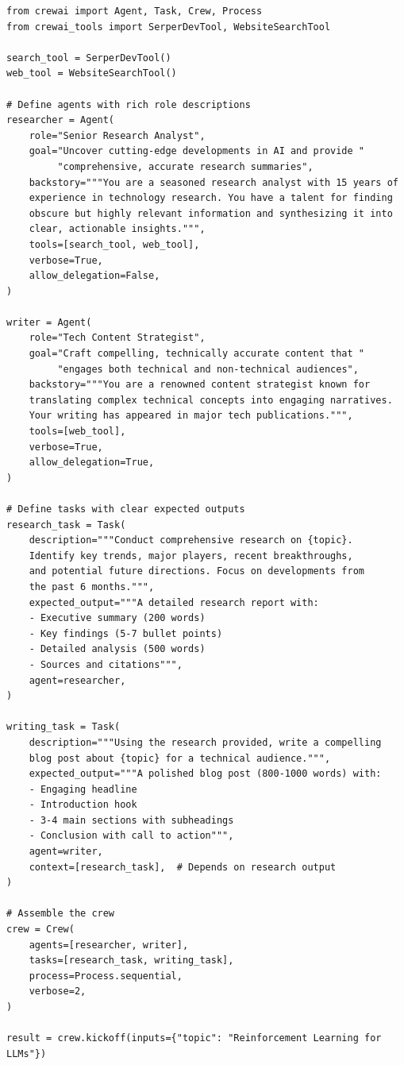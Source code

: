 \begin{lstlisting}[style=pythonstyle, caption={CrewAI role-based agent team}]
from crewai import Agent, Task, Crew, Process
from crewai_tools import SerperDevTool, WebsiteSearchTool

search_tool = SerperDevTool()
web_tool = WebsiteSearchTool()

# Define agents with rich role descriptions
researcher = Agent(
    role="Senior Research Analyst",
    goal="Uncover cutting-edge developments in AI and provide "
         "comprehensive, accurate research summaries",
    backstory="""You are a seasoned research analyst with 15 years of
    experience in technology research. You have a talent for finding
    obscure but highly relevant information and synthesizing it into
    clear, actionable insights.""",
    tools=[search_tool, web_tool],
    verbose=True,
    allow_delegation=False,
)

writer = Agent(
    role="Tech Content Strategist",
    goal="Craft compelling, technically accurate content that "
         "engages both technical and non-technical audiences",
    backstory="""You are a renowned content strategist known for
    translating complex technical concepts into engaging narratives.
    Your writing has appeared in major tech publications.""",
    tools=[web_tool],
    verbose=True,
    allow_delegation=True,
)

# Define tasks with clear expected outputs
research_task = Task(
    description="""Conduct comprehensive research on {topic}.
    Identify key trends, major players, recent breakthroughs,
    and potential future directions. Focus on developments from
    the past 6 months.""",
    expected_output="""A detailed research report with:
    - Executive summary (200 words)
    - Key findings (5-7 bullet points)
    - Detailed analysis (500 words)
    - Sources and citations""",
    agent=researcher,
)

writing_task = Task(
    description="""Using the research provided, write a compelling
    blog post about {topic} for a technical audience.""",
    expected_output="""A polished blog post (800-1000 words) with:
    - Engaging headline
    - Introduction hook
    - 3-4 main sections with subheadings
    - Conclusion with call to action""",
    agent=writer,
    context=[research_task],  # Depends on research output
)

# Assemble the crew
crew = Crew(
    agents=[researcher, writer],
    tasks=[research_task, writing_task],
    process=Process.sequential,
    verbose=2,
)

result = crew.kickoff(inputs={"topic": "Reinforcement Learning for LLMs"})
\end{lstlisting}

